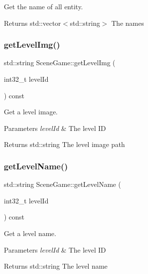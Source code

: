 Get the name of all entity. 

\begin{DoxyReturn}{Returns}
std\+::vector$<$std\+::string$>$ The names 
\end{DoxyReturn}
\mbox{\label{class_scene_game_adbaa88f6ec0f3e093474e8d293b65282}} 
\subsubsection{\texorpdfstring{get\+Level\+Img()}{getLevelImg()}}
{\footnotesize\ttfamily std\+::string Scene\+Game\+::get\+Level\+Img (\begin{DoxyParamCaption}\item[{int32\+\_\+t}]{level\+Id }\end{DoxyParamCaption}) const}



Get a level image. 


\begin{DoxyParams}{Parameters}
{\em level\+Id} & The level ID \\
\hline
\end{DoxyParams}
\begin{DoxyReturn}{Returns}
std\+::string The level image path 
\end{DoxyReturn}
\mbox{\label{class_scene_game_a29ee8ee172dcd5b70385f29f39e769bc}} 
\subsubsection{\texorpdfstring{get\+Level\+Name()}{getLevelName()}}
{\footnotesize\ttfamily std\+::string Scene\+Game\+::get\+Level\+Name (\begin{DoxyParamCaption}\item[{int32\+\_\+t}]{level\+Id }\end{DoxyParamCaption}) const}



Get a level name. 


\begin{DoxyParams}{Parameters}
{\em level\+Id} & The level ID \\
\hline
\end{DoxyParams}
\begin{DoxyReturn}{Returns}
std\+::string The level name 
\end{DoxyReturn}
\mbox{\label{class_scene_game_a49b0881897a0e7dca907a694ecce8c92}} 

